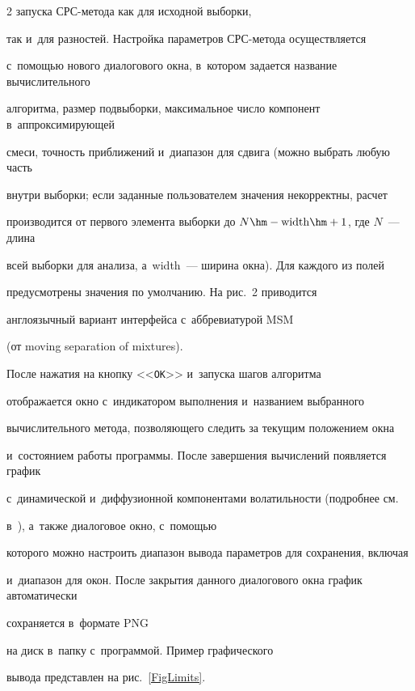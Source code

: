 \begin{multicols}{2}
запуска СРС-ме\-то\-да как для исходной выборки, 

так и~для разностей. Настройка параметров СРС-ме\-то\-да осуществляется 

с~по\-мощью нового диалогового окна, в~котором задается название вычислительного 

алгоритма, размер подвыборки, максимальное число компонент в~аппроксимирующей 

смеси, точность приближений и~диапазон для сдвига (можно выбрать любую часть 

внут\-ри выборки; если заданные пользователем значения некорректны, расчет 

производится от первого элемента выборки до $N\hm-\mathrm{width}\hm+1$, где $N$~--- длина 

всей выборки для анализа, а~width~--- ширина окна). Для каждого из полей 

предусмотрены значения по умолчанию. На рис.~2 приводится 

англоязычный вариант интерфейса с~аббревиатурой MSM 

(от {moving separation of mixtures}).







После нажатия на кнопку <<\verb"ОК">> и~запуска шагов алгоритма 

отображается окно с~индикатором выполнения и~названием выбранного 

вычислительного метода, позволяющего следить за текущим положением окна 

и~состоянием работы программы. После завершения вычислений появляется график 

с~динамической и~диффузионной компонентами волатильности (подробнее см.\ 

в~\cite{Korolev2011}), а~так\-же диалоговое окно, с~по\-мощью 

которого можно настроить диапазон вывода параметров для сохранения, включая 

и~диапазон для окон. После закрытия данного диалогового окна график автоматически 

сохраняется в~формате PNG 

на диск в~папку с~программой. Пример графического 

вывода пред\-став\-лен на рис.~\ref{FigLimits}.



\begin{figure} %


\end{figure}
\end{multicols}
